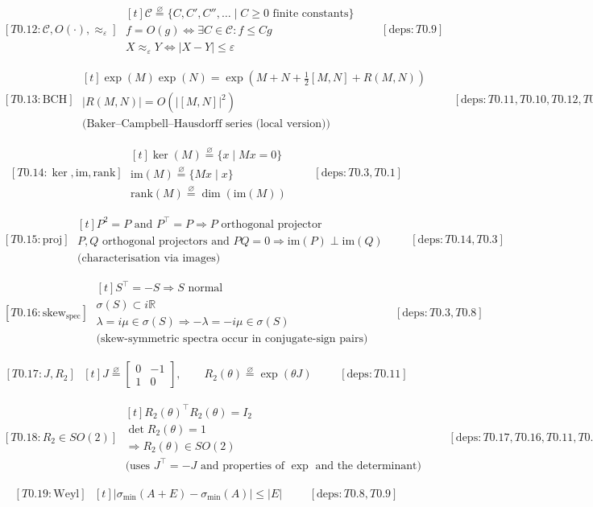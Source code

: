 \documentclass[11pt]{article}
\newcommand{\eqdef}{\overset{\varnothing}{=}}
\newcommand{\ProofBlock}[3]{%
  \begin{equation*}
    \boxed{[#1]}\;
    \begin{aligned}[t]
      #2
    \end{aligned}
    \qquad [\mathrm{deps}: #3]
  \end{equation*}
}
\newcommand{\Note}[1]{\text{(#1)}}
\newcommand{\Real}{\mathbb{R}}
\begin{document}
\ProofBlock{T0.12:\mathcal{C},O(\cdot),\approx_\varepsilon}{
\mathcal{C} \eqdef \{C,C',C'',\dots \mid C\ge 0 \text{ finite constants}\}\\
f = O(g) \Leftrightarrow \exists C\in\mathcal{C}: f\le Cg\\
X \approx_\varepsilon Y \Leftrightarrow |X-Y|\le \varepsilon
}{T0.9}

\ProofBlock{T0.13:\mathrm{BCH}}{
\exp(M)\exp(N) = \exp\!\left(M+N+\tfrac12[M,N]+R(M,N)\right)\\
|R(M,N)| = O(|[M,N]|^2)\\
\Note{Baker--Campbell--Hausdorff series (local version)}
}{T0.11,T0.10,T0.12,T0.9}

\ProofBlock{T0.14:\ker,\mathrm{im},\mathrm{rank}}{
\ker(M) \eqdef \{x \mid Mx=0\}\\
\mathrm{im}(M) \eqdef \{Mx \mid x\}\\
\mathrm{rank}(M) \eqdef \dim(\mathrm{im}(M))
}{T0.3,T0.1}

\ProofBlock{T0.15:\mathrm{proj}}{
P^2 = P \text{ and } P^\top = P \Rightarrow P \text{ orthogonal projector}\\
P,Q \text{ orthogonal projectors and } PQ=0 \Rightarrow \mathrm{im}(P)\perp \mathrm{im}(Q)\\
\Note{characterisation via images}
}{T0.14,T0.3}

\ProofBlock{T0.16:\mathrm{skew}_\mathrm{spec}}{
S^\top = -S \Rightarrow S \text{ normal}\\
\sigma(S)\subset i\Real\\
\lambda = i\mu \in \sigma(S) \Rightarrow -\lambda = -i\mu \in \sigma(S)\\
\Note{skew-symmetric spectra occur in conjugate-sign pairs}
}{T0.3,T0.8}

\ProofBlock{T0.17:J,R_2}{
J \eqdef
\begin{bmatrix}
0 & -1\\
1 & 0
\end{bmatrix},\qquad
R_2(\theta) \eqdef \exp(\theta J)
}{T0.11}

\ProofBlock{T0.18:R_2\in SO(2)}{
R_2(\theta)^\top R_2(\theta) = I_2\\
\det R_2(\theta) = 1\\
\Rightarrow R_2(\theta)\in SO(2)\\
\Note{uses $J^\top=-J$ and properties of $\exp$ and the determinant}
}{T0.17,T0.16,T0.11,T0.6,T0.4,T0.7}

\ProofBlock{T0.19:\mathrm{Weyl}}{
\bigl|\sigma_{\min}(A+E) - \sigma_{\min}(A)\bigr| \le |E|
}{T0.8,T0.9}
\end{document}
